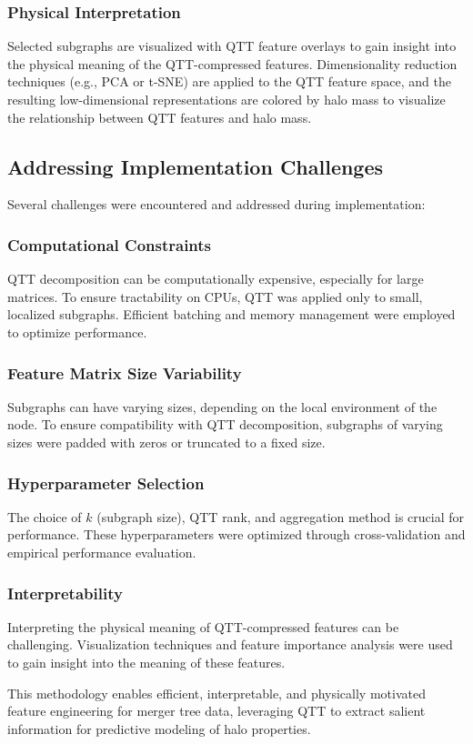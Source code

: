\documentclass[twocolumn]{aastex631}
\begin{document}
\subsubsection{Physical Interpretation}
Selected subgraphs are visualized with QTT feature overlays to gain insight into the physical meaning of the QTT-compressed features. Dimensionality reduction techniques (e.g., PCA or t-SNE) are applied to the QTT feature space, and the resulting low-dimensional representations are colored by halo mass to visualize the relationship between QTT features and halo mass.

\subsection{Addressing Implementation Challenges}

Several challenges were encountered and addressed during implementation:

\subsubsection{Computational Constraints}
QTT decomposition can be computationally expensive, especially for large matrices. To ensure tractability on CPUs, QTT was applied only to small, localized subgraphs. Efficient batching and memory management were employed to optimize performance.

\subsubsection{Feature Matrix Size Variability}
Subgraphs can have varying sizes, depending on the local environment of the node. To ensure compatibility with QTT decomposition, subgraphs of varying sizes were padded with zeros or truncated to a fixed size.

\subsubsection{Hyperparameter Selection}
The choice of \(k\) (subgraph size), QTT rank, and aggregation method is crucial for performance. These hyperparameters were optimized through cross-validation and empirical performance evaluation.

\subsubsection{Interpretability}
Interpreting the physical meaning of QTT-compressed features can be challenging. Visualization techniques and feature importance analysis were used to gain insight into the meaning of these features.

This methodology enables efficient, interpretable, and physically motivated feature engineering for merger tree data, leveraging QTT to extract salient information for predictive modeling of halo properties.
\end{document}
